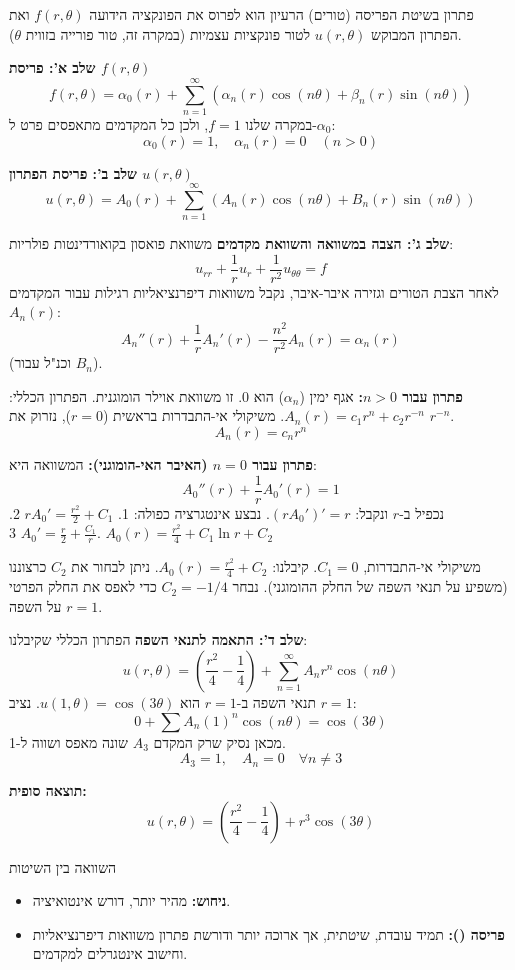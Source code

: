 \begin{examplebox}{פתרון בשיטת הפריסה (טורים)}
הרעיון הוא לפרוס את הפונקציה הידועה $f(r, \theta)$ ואת הפתרון המבוקש $u(r, \theta)$ לטור פונקציות עצמיות (במקרה זה, טור פורייה בזווית $\theta$).

\textbf{שלב א': פריסת $f(r, \theta)$}
$$ f(r, \theta) = \alpha_0(r) + \sum_{n=1}^{\infty} \left( \alpha_n(r) \cos(n\theta) + \beta_n(r) \sin(n\theta) \right) $$
במקרה שלנו $f=1$, ולכן כל המקדמים מתאפסים פרט ל-$\alpha_0$:
$$ \alpha_0(r) = 1, \quad \alpha_n(r) = 0 \quad (n>0) $$

\textbf{שלב ב': פריסת הפתרון $u(r, \theta)$}
$$ u(r, \theta) = A_0(r) + \sum_{n=1}^{\infty} \left( A_n(r) \cos(n\theta) + B_n(r) \sin(n\theta) \right) $$

\textbf{שלב ג': הצבה במשוואה והשוואת מקדמים}
משוואת פואסון בקואורדינטות פולריות:
$$ u_{rr} + \frac{1}{r}u_r + \frac{1}{r^2}u_{\theta\theta} = f $$
לאחר הצבת הטורים וגזירה איבר-איבר, נקבל משוואות דיפרנציאליות רגילות עבור המקדמים $A_n(r)$:
$$ A_n''(r) + \frac{1}{r}A_n'(r) - \frac{n^2}{r^2}A_n(r) = \alpha_n(r) $$
(וכנ"ל עבור $B_n$).

\textbf{פתרון עבור $n > 0$:}
אגף ימין ($\alpha_n$) הוא 0. זו משוואת אוילר הומוגנית.
הפתרון הכללי: $A_n(r) = c_1 r^n + c_2 r^{-n}$.
משיקולי אי-התבדרות בראשית ($r=0$), נזרוק את $r^{-n}$.
$$ A_n(r) = c_n r^n $$

\textbf{פתרון עבור $n = 0$ (האיבר האי-הומוגני):}
המשוואה היא:
$$ A_0''(r) + \frac{1}{r}A_0'(r) = 1 $$
נכפיל ב-$r$ ונקבל: $(r A_0')' = r$. נבצע אינטגרציה כפולה:
1. $r A_0' = \frac{r^2}{2} + C_1$
2. $A_0' = \frac{r}{2} + \frac{C_1}{r}$
3. $A_0(r) = \frac{r^2}{4} + C_1 \ln r + C_2$

משיקולי אי-התבדרות, $C_1=0$.
קיבלנו: $A_0(r) = \frac{r^2}{4} + C_2$.
ניתן לבחור את $C_2$ כרצוננו (משפיע על תנאי השפה של החלק ההומוגני). נבחר $C_2 = -1/4$ כדי לאפס את החלק הפרטי על השפה $r=1$.

\textbf{שלב ד': התאמה לתנאי השפה}
הפתרון הכללי שקיבלנו:
$$ u(r, \theta) = \left(\frac{r^2}{4} - \frac{1}{4}\right) + \sum_{n=1}^{\infty} A_n r^n \cos(n\theta) $$
תנאי השפה ב-$r=1$ הוא $u(1, \theta) = \cos(3\theta)$.
נציב $r=1$:
$$ 0 + \sum A_n (1)^n \cos(n\theta) = \cos(3\theta) $$
מכאן נסיק שרק המקדם $A_3$ שונה מאפס ושווה ל-1.
$$ A_3 = 1, \quad A_n = 0 \quad \forall n \neq 3 $$

\textbf{תוצאה סופית:}
$$ u(r, \theta) = \left(\frac{r^2}{4} - \frac{1}{4}\right) + r^3 \cos(3\theta) $$
\end{examplebox}

\begin{physicsnote}{השוואה בין השיטות}
\begin{itemize}
    \item \textbf{ניחוש:} מהיר יותר, דורש אינטואיציה.
    \item \textbf{פריסה ():} תמיד עובדת, שיטתית, אך ארוכה יותר ודורשת פתרון משוואות דיפרנציאליות וחישוב אינטגרלים למקדמים.
\end{itemize}
\end{physicsnote}


